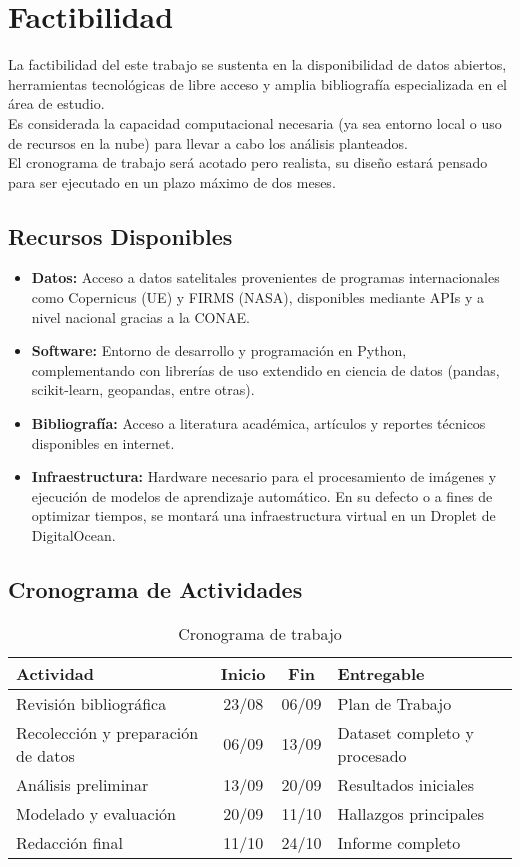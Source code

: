 \section{Factibilidad}
La factibilidad del este trabajo se sustenta en la disponibilidad de datos abiertos, herramientas tecnológicas de libre acceso y amplia bibliografía especializada en el área de estudio. \\ 

Es considerada la capacidad computacional necesaria (ya sea entorno local o uso de recursos en la nube) para llevar a cabo los análisis planteados. \\

El cronograma de trabajo será acotado pero realista, su diseño estará pensado para ser ejecutado en un plazo máximo de dos meses.

\subsection{Recursos Disponibles}
\begin{itemize}
    \item \textbf{Datos:} Acceso a datos satelitales provenientes de programas internacionales como Copernicus (UE) y FIRMS (NASA), disponibles mediante APIs y a nivel nacional gracias a la CONAE.
    \item \textbf{Software:} Entorno de desarrollo y programación en Python, complementando con librerías de uso extendido en ciencia de datos (pandas, scikit-learn, geopandas, entre otras).
    \item \textbf{Bibliografía:} Acceso a literatura académica, artículos y reportes técnicos disponibles en internet.
    \item \textbf{Infraestructura:} Hardware necesario para el procesamiento de imágenes y ejecución de modelos de aprendizaje automático. En su defecto o a fines de optimizar tiempos, se montará una infraestructura virtual en un Droplet de DigitalOcean.
\end{itemize}

\subsection{Cronograma de Actividades}
\begin{table}[h]
\centering
\begin{tabular}{lccl}
\toprule
\textbf{Actividad} & \textbf{Inicio} & \textbf{Fin} & \textbf{Entregable} \\
\midrule
Revisión bibliográfica & 23/08 & 06/09 & Plan de Trabajo \\
Recolección y preparación de datos & 06/09 & 13/09 & Dataset completo y procesado \\
Análisis preliminar & 13/09 & 20/09 & Resultados iniciales \\
Modelado y evaluación & 20/09 & 11/10 & Hallazgos principales \\
Redacción final & 11/10 & 24/10 & Informe completo \\
\bottomrule
\end{tabular}
\caption{Cronograma de trabajo}
\end{table}

